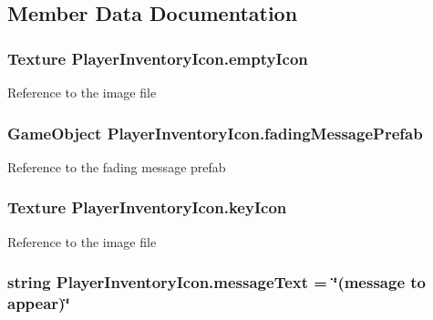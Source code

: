 \subsection{Member Data Documentation}
\hypertarget{class_player_inventory_icon_adc17dc396f9f6cc8f57ecad911b68485}{
\subsubsection[{empty\-Icon}]{\setlength{\rightskip}{0pt plus 5cm}Texture Player\-Inventory\-Icon.\-empty\-Icon}}\label{class_player_inventory_icon_adc17dc396f9f6cc8f57ecad911b68485}
Reference to the image file \hypertarget{class_player_inventory_icon_a860fe9f495c97467135ca7eaf51211d9}{
\subsubsection[{fading\-Message\-Prefab}]{\setlength{\rightskip}{0pt plus 5cm}Game\-Object Player\-Inventory\-Icon.\-fading\-Message\-Prefab}}\label{class_player_inventory_icon_a860fe9f495c97467135ca7eaf51211d9}
Reference to the fading message prefab \hypertarget{class_player_inventory_icon_a77a36854eb69ad8e1065b3020389cde0}{
\subsubsection[{key\-Icon}]{\setlength{\rightskip}{0pt plus 5cm}Texture Player\-Inventory\-Icon.\-key\-Icon}}\label{class_player_inventory_icon_a77a36854eb69ad8e1065b3020389cde0}
Reference to the image file \hypertarget{class_player_inventory_icon_a1cfc870c87a3efae9dd66089cadc0485}{
\subsubsection[{message\-Text}]{\setlength{\rightskip}{0pt plus 5cm}string Player\-Inventory\-Icon.\-message\-Text = \char`\"{}(message to appear)\char`\"{}}}\label{class_player_inventory_icon_a1cfc870c87a3efae9dd66089cadc0485}
